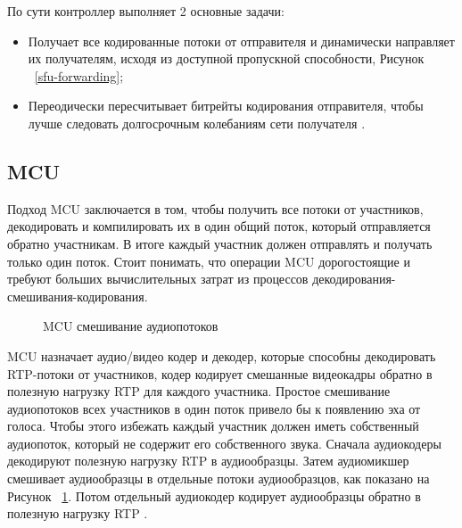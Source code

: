 По сути контроллер выполняет 2 основные задачи:
\begin{itemize}
	\item[1.] Получает все кодированные потоки от отправителя и динамически направляет их получателям, исходя из доступной пропускной способности, Рисунок ~\ref{sfu-forwarding};
	\item[2.] Переодически пересчитывает битрейты кодирования отправителя, чтобы лучше следовать долгосрочным колебаниям сети получателя \cite{v18}.
\end{itemize}

\subsection{MCU}

Подход MCU заключается в том, чтобы получить все потоки от участников, декодировать и компилировать их в один общий поток, который отправляется обратно участникам. В итоге каждый участник должен отправлять и получать только один поток. Стоит понимать, что операции MCU дорогостоящие и требуют больших вычислительных затрат из процессов декодирования-смешивания-кодирования.

\begin{figure}[ht]
\begin{center}

\caption{
\label{mcu}
     MCU смешивание аудиопотоков}
\end {center}
\end {figure}

MCU назначает аудио/видео кодер и декодер, которые способны декодировать RTP-потоки от участников, кодер кодирует смешанные видеокадры обратно в полезную нагрузку RTP для каждого участника. Простое смешивание аудиопотоков всех участников в один поток привело бы к появлению эха от голоса. Чтобы этого избежать каждый участник должен иметь собственный аудиопоток, который не содержит его собственного звука. Сначала аудиокодеры декодируют полезную нагрузку RTP в аудиообразцы. Затем аудиомикшер смешивает аудиообразцы в отдельные потоки аудиообразцов, как показано на Рисунок ~\ref{mcu}. Потом отдельный аудиокодер кодирует аудиообразцы обратно в полезную нагрузку RTP \cite{v19}.

